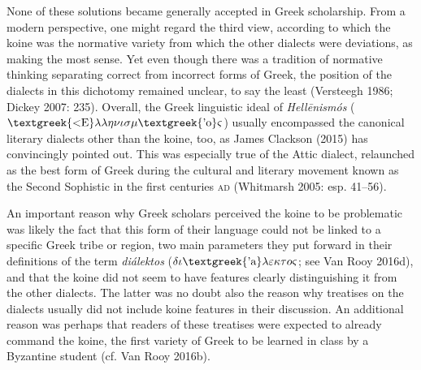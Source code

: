 \documentclass[12pt]{article}
\newenvironment{styleStandard}{\renewcommand\baselinestretch{1.25}\setlength\leftskip{0in}\setlength\rightskip{0in}\setlength\parindent{0.1972in}\setlength\parfillskip{0pt plus 1fil}\setlength\parskip{0in plus 1pt}\writerlistparindent\writerlistleftskip\leavevmode\normalfont\normalsize\writerlistlabel\ignorespaces}{\unskip\vspace{0in plus 1pt}\par}
\newcommand\writerlistleftskip{}
\newcommand\writerlistparindent{}
\newcommand\writerlistlabel{}
\begin{document}
\begin{styleStandard}
None of these solutions became generally accepted in Greek scholarship. From a modern perspective, one might regard the third view, according to which the koine was the normative variety from which the other dialects were deviations, as making the most sense. Yet even though there was a tradition of normative thinking separating correct from incorrect forms of Greek, the position of the dialects in this dichotomy remained unclear, to say the least (Versteegh 1986; Dickey 2007: 235). Overall, the Greek linguistic ideal of \textit{Hell\=enismós} ($\text{\textgreek{<E}}\lambda \lambda \eta \nu \iota \sigma \mu \text{\textgreek{'o}}\varsigma $) usually encompassed the canonical literary dialects other than the koine, too, as James Clackson (2015) has convincingly pointed out. This was especially true of the Attic dialect, relaunched as the best form of Greek during the cultural and literary movement known as the Second Sophistic in the first centuries \textsc{ad} (Whitmarsh 2005: esp. 41–56).
\end{styleStandard}

\begin{styleStandard}
An important reason why Greek scholars perceived the koine to be problematic was likely the fact that this form of their language could not be linked to a specific Greek tribe or region, two main parameters they put forward in their definitions of the term \textit{diálektos} ($\delta \iota \text{\textgreek{'a}}\lambda \varepsilon \kappa \tau o\varsigma $; see Van Rooy 2016d), and that the koine did not seem to have features clearly distinguishing it from the other dialects. The latter was no doubt also the reason why treatises on the dialects usually did not include koine features in their discussion. An additional reason was perhaps that readers of these treatises were expected to already command the koine, the first variety of Greek to be learned in class by a Byzantine student (cf. Van Rooy 2016b).
\end{styleStandard}
\end{document}
